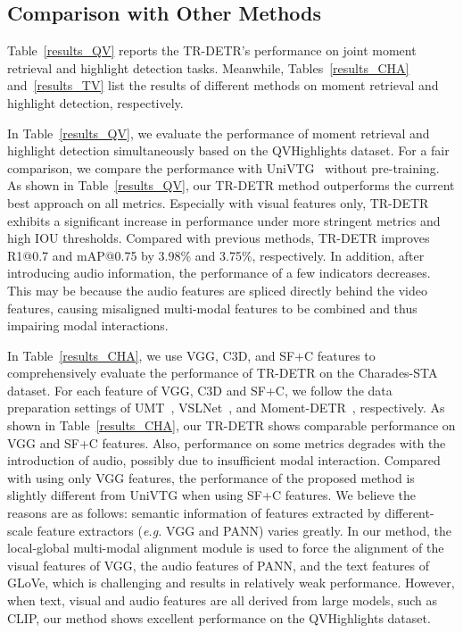 \subsection{Comparison with Other Methods}
Table~\ref{results_QV} reports the TR-DETR's performance on joint moment retrieval and highlight detection tasks. Meanwhile, Tables~\ref{results_CHA} and~\ref{results_TV} list the results of different methods on moment retrieval and highlight detection, respectively.

In Table~\ref{results_QV}, we evaluate the performance of moment retrieval and highlight detection simultaneously based on the QVHighlights dataset. For a fair comparison, we compare the performance with UniVTG~\cite{DBLP:journals/corr/abs-2307-16715} without pre-training. As shown in Table~\ref{results_QV}, our TR-DETR method outperforms the current best approach on all metrics.  Especially with visual features only, TR-DETR exhibits a significant increase in performance under more stringent metrics and high IOU thresholds.  Compared with previous methods, TR-DETR improves R1@0.7 and mAP@0.75 by 3.98\% and 3.75\%, respectively.
In addition, after introducing audio information, the performance of a few indicators decreases. This may be because the audio features are spliced directly behind the video features, causing misaligned multi-modal features to be combined and thus impairing modal interactions.

In Table~\ref{results_CHA}, we use VGG, C3D, and SF+C features to comprehensively evaluate the performance of TR-DETR on the Charades-STA dataset. For each feature of VGG, C3D and SF+C, we follow the data preparation settings of UMT~\cite{liu2022umt}, VSLNet~\cite{zhang2021natural}, and Moment-DETR~\cite{lei2021detecting}, respectively.  As shown in Table~\ref{results_CHA}, our TR-DETR shows comparable performance on VGG and SF+C features.  Also, performance on some metrics degrades with the introduction of audio, possibly due to insufficient modal interaction. Compared with using only VGG features, the performance of the proposed method is slightly different from UniVTG when using SF+C features. We believe the reasons are as follows: semantic information of features extracted by different-scale feature extractors (\emph{e.g.} VGG and PANN) varies greatly. In our method, the local-global multi-modal alignment module is used to force the alignment of the visual features of VGG, the audio features of PANN, and the text features of GLoVe, which is challenging and results in relatively weak performance. However, when text, visual and audio features are all derived from large models, such as CLIP, our method shows excellent performance on the  QVHighlights dataset.

